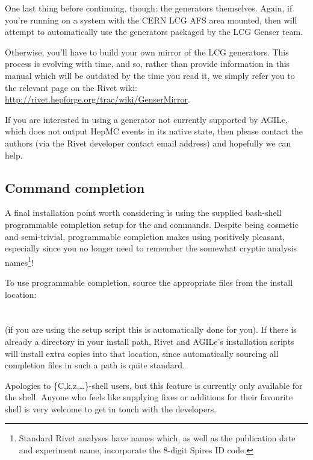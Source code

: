 One last thing before continuing, though: the generators themselves. Again, if
you're running on a system with the CERN LCG AFS area mounted, then
 will attempt to automatically use the generators packaged by the
LCG Genser team.

Otherwise, you'll have to build your own mirror of the LCG generators. This
process is evolving with time, and so, rather than provide information in this
manual which will be outdated by the time you read it, we simply refer you to
the relevant page on the Rivet wiki:
\url{http://rivet.hepforge.org/trac/wiki/GenserMirror}.

If you are interested in using a generator not currently supported by AGILe,
which does not output HepMC events in its native state, then please contact the
authors (via the Rivet developer contact email address) and hopefully we can
help.


\subsection{Command completion}

A final installation point worth considering is using the supplied bash-shell
programmable completion setup for the  and 
commands. Despite being cosmetic and semi-trivial, programmable completion makes
using  positively pleasant, especially since you no longer need to
remember the somewhat cryptic analysis names\footnote{Standard Rivet analyses
  have names which, as well as the publication date and experiment name,
  incorporate the 8-digit Spires ID code.}!

To use programmable completion, source the appropriate files from the install
location:\\
\\
\\
(if you are using the setup script  this is automatically
done for you).
If there is already a  directory in
your install path, Rivet and AGILe's installation scripts will install extra
copies into that location, since automatically sourcing all completion files in
such a path is quite standard.

Apologies to \{C,k,z,\dots\}-shell users, but this feature is currently only
available for the  shell. Anyone who feels like supplying fixes or
additions for their favourite shell is very welcome to get in touch with the
developers.



